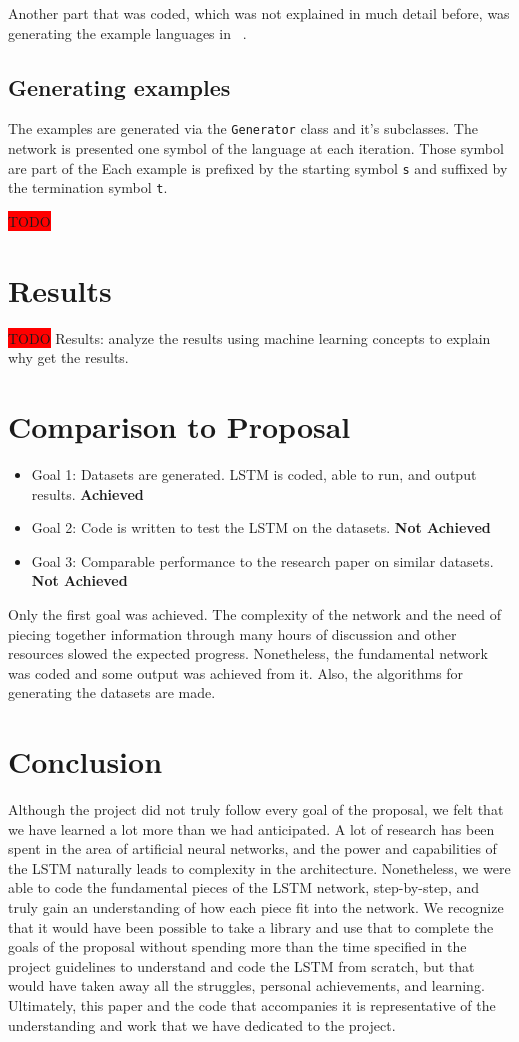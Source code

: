\documentclass[11pt,letterpaper]{article}
\begin{document}
Another part that was coded, which was not explained in much detail before, was generating the example languages in ~\cite{Gers:01}.

\subsection{Generating examples}
The examples are generated via the \verb!Generator! class and it's subclasses. The network is presented one symbol of the language at each iteration. Those symbol are part of the  Each example is prefixed by the starting symbol \verb!s! and suffixed by the termination symbol \verb!t!. 
 

\colorbox{red}{TODO}

\section{Results}
\colorbox{red}{TODO}
Results: analyze the results using machine learning concepts to explain why get the results.

\section{Comparison to Proposal}
\begin{itemize}
	\item Goal 1: Datasets are generated. LSTM is coded, able to run, and output results. \textbf{Achieved}
	\item Goal 2: Code is written to test the LSTM on the datasets. \textbf{Not Achieved}
	\item Goal 3: Comparable performance to the research paper on similar datasets. \textbf{Not Achieved}
\end{itemize}

Only the first goal was achieved. The complexity of the network and the need of piecing together information through many hours of discussion and other resources slowed the expected progress. Nonetheless, the fundamental network was coded and some output was achieved from it. Also, the algorithms for generating the datasets are made. 

\section{Conclusion}
Although the project did not truly follow every goal of the proposal, we felt that we have learned a lot more than we had anticipated. A lot of research has been spent in the area of artificial neural networks, and the power and capabilities of the LSTM naturally leads to complexity in the architecture. Nonetheless, we were able to code the fundamental pieces of the LSTM network, step-by-step, and truly gain an understanding of how each piece fit into the network. We recognize that it would have been possible to take a library and use that to complete the goals of the proposal without spending more than the time specified in the project guidelines to understand and code the LSTM from scratch, but that would have taken away all the struggles, personal achievements, and learning. Ultimately, this paper and the code that accompanies it is representative of the understanding and work that we have dedicated to the project.
\end{document}
